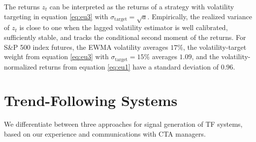 \documentclass[hidelinks]{siamonline250211}
\begin{document}
The returns $z_{t}$ can be interpreted as the returns of a strategy with volatility targeting in equation \eqref{eq:eu3}  with $\sigma_{\mathrm{target}}=\sqrt{a}$. Empirically, the realized variance of $z_{t}$ is close to one when the lagged volatility estimator is well calibrated, sufficiently stable, and tracks the conditional second moment of the returns. For S\&P 500 index futures, the EWMA volatility averages $17\%$, the volatility-target weight from equation \eqref{eq:eu3} with $\sigma_{\mathrm{target}}=15\%$ averages $1.09$, and the volatility-normalized returns from equation \eqref{eq:eu1} have a standard deviation of $0.96$.






\section{Trend-Following Systems}\label{sc:tfs}



We differentiate between three approaches for signal generation of TF systems, based on our experience and communications with CTA managers.
\end{document}
